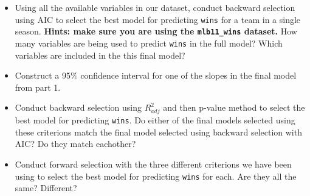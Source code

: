 \documentclass[]{book}
\theoremstyle{definition}
\theoremstyle{definition}
\theoremstyle{definition}
\theoremstyle{remark}
\begin{document}
\begin{itemize}
\item
  Using all the available variables in our dataset, conduct backward
  selection using AIC to select the best model for predicting
  \texttt{wins} for a team in a single season. \textbf{Hints: make sure
  you are using the \texttt{mlb11\_wins} dataset.} How many variables
  are being used to predict \texttt{wins} in the full model? Which
  variables are included in the this final model?
\item
  Construct a 95\% confidence interval for one of the slopes in the
  final model from part 1.
\item
  Conduct backward selection using \(R^2_{adj}\) and then p-value method
  to select the best model for predicting \texttt{wins}. Do either of
  the final models selected using these criterions match the final model
  selected using backward selection with AIC? Do they match eachother?
\item
  Conduct forward selection with the three different criterions we have
  been using to select the best model for predicting \texttt{wins} for
  each. Are they all the same? Different?
\end{itemize}


\end{document}

